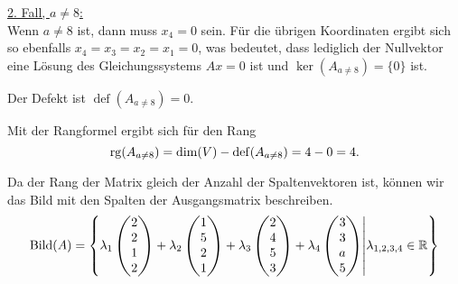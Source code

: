 \documentclass[main.tex]{subfiles}
\begin{document}
\underline{2. Fall, $a \neq 8$:}\\
Wenn $a \neq 8$ ist, dann muss $x_4 = 0$ sein. Für die übrigen Koordinaten ergibt sich so ebenfalls $x_4 = x_3 = x_2 = x_1 = 0$, was bedeutet, dass lediglich der Nullvektor eine Lösung des Gleichungssystems $Ax=0$ ist und $\ker(A_{a\neq 8})=\{0\}$ ist.

Der Defekt ist $\operatorname{def}(A_{a\neq 8}) = 0$.

Mit der Rangformel ergibt sich für den Rang
$$
\operatorname{rg}(A_{a\neq 8}) = \dim(V) - \operatorname{def} (A_{a\neq 8}) = 4 - 0 = 4.
$$

Da der Rang der Matrix gleich der Anzahl der Spaltenvektoren ist, können wir das Bild mit den Spalten der Ausgangsmatrix beschreiben.
$$
    \Bild (A) = \left\{
        \lambda_1 \vektor{2\\2\\1\\2} + 
        \lambda_2 \vektor{1\\5\\2\\1} + 
        \lambda_3 \vektor{2\\4\\5\\3} +
        \lambda_4 \vektor{3\\3\\a\\5}
        \middle| \lambda_{1,2,3,4} \in \R
      \right\}
$$
\end{document}
